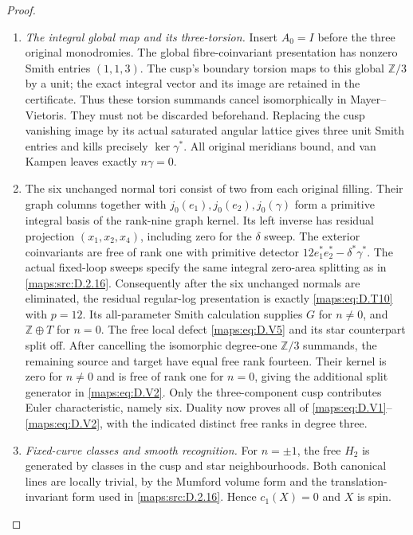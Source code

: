 \begin{proof}
\begin{enumerate}[label=\arabic*.,leftmargin=*]
\item \emph{The integral global map and its three-torsion.}
Insert $A_0=I$ before the three original monodromies.
The global fibre-coinvariant presentation has nonzero
Smith entries $(1,1,3)$. The cusp's boundary torsion maps
to this global $\mathbb Z/3$ by a unit; the exact integral
vector and its image are retained in the certificate.
Thus these torsion summands cancel isomorphically in
Mayer--Vietoris. They must not be discarded beforehand.
Replacing the cusp vanishing image by its actual saturated
angular lattice gives three unit Smith entries and kills
precisely $\ker\gamma^*$. All original meridians bound,
and van Kampen leaves exactly $n\gamma=0$.

\item The six unchanged normal tori consist of two from each
original filling. Their graph columns together with
$j_0(e_1),j_0(e_2),j_0(\gamma)$ form a primitive integral
basis of the rank-nine graph kernel. Its left inverse
has residual projection $(x_1,x_2,x_4)$, including zero
for the $\delta$ sweep. The exterior coinvariants are
free of rank one with primitive detector
$12e_1^*e_2^*-\delta^*\gamma^*$.
The actual fixed-loop sweeps specify the same integral
zero-area splitting as in \ref{maps:src:D.2.16}. Consequently after the
six unchanged normals are eliminated, the residual
regular-log presentation is exactly \eqref{maps:eq:D.T10} with $p=12$.
Its all-parameter Smith calculation supplies $G$ for
$n\ne0$, and $\mathbb Z\oplus T$ for $n=0$.
The free local defect \eqref{maps:eq:D.V5} and its star counterpart
split off. After cancelling the isomorphic degree-one
$\mathbb Z/3$ summands, the remaining source and target
have equal free rank fourteen. Their kernel is zero for
$n\ne0$ and is free of rank one for $n=0$, giving the
additional split generator in \eqref{maps:eq:D.V2}.
Only the three-component cusp contributes Euler
characteristic, namely six. Duality now proves all of
\eqref{maps:eq:D.V1}--\eqref{maps:eq:D.V2}, with the indicated distinct free ranks
in degree three.

\item \emph{Fixed-curve classes and smooth recognition.}
For $n=\pm1$, the free $H_2$ is generated by classes in
the cusp and star neighbourhoods. Both canonical lines
are locally trivial, by the Mumford volume form and
the translation-invariant form used in \ref{maps:src:D.2.16}.
Hence $c_1(X)=0$ and $X$ is spin.


\end{enumerate}
\end{proof}
